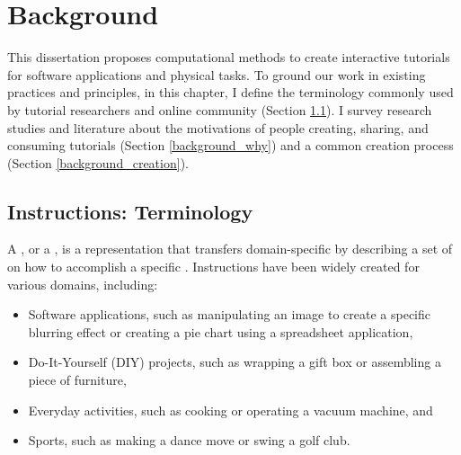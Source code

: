 
\chapter{Background}
\label{chapter_background}

This dissertation proposes computational methods to create interactive tutorials for software applications and physical tasks. To ground our work in existing practices and principles, in this chapter, I define the terminology commonly used by tutorial researchers and online community (Section \ref{background_terms}).
%
I survey research studies and literature about the motivations of people creating, sharing, and consuming tutorials (Section \ref{background_why}) and a common creation process (Section \ref{background_creation}).


\section{Instructions: Terminology}
\label{background_terms}

A , or a , is a representation that transfers domain-specific  by describing a set of  on how to accomplish a specific . Instructions have been widely created for various domains, including:

\begin{itemize}
  \itemsep -2pt
  \item Software applications, such as manipulating an image to create a specific blurring effect or creating a pie chart using a spreadsheet application,
  \item Do-It-Yourself (DIY) projects, such as wrapping a gift box or assembling a piece of furniture,
  \item Everyday activities, such as cooking or operating a vacuum machine, and
  \item Sports, such as making a dance move or swing a golf club.
\end{itemize}

